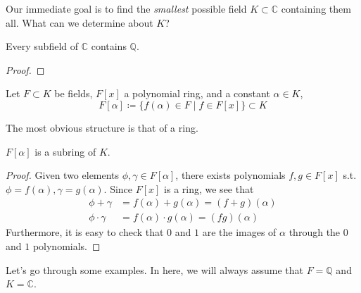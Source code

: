     Our immediate goal is to find the \textit{smallest} possible field $K \subset \mathbb{C}$ containing them all. What can we determine about $K$? 
    
    \begin{lemma}
      Every subfield of $\mathbb{C}$ contains $\mathbb{Q}$. 
    \end{lemma}
    \begin{proof}
      
    \end{proof} 

    \begin{definition} 
      Let $F \subset K$ be fields, $F[x]$ a polynomial ring, and a constant $\alpha \in K$, 
      \begin{equation}
        F[\alpha] \coloneqq \{ f(\alpha) \in F \mid f \in F[x]\} \subset K
      \end{equation}
    \end{definition} 

    The most obvious structure is that of a ring. 

    \begin{lemma}[Rings]
      $F[\alpha]$ is a subring of $K$. 
    \end{lemma}
    \begin{proof}
      Given two elements $\phi, \gamma \in F[\alpha]$, there exists polynomials $f, g \in F[x]$ s.t. $\phi = f(\alpha), \gamma = g(\alpha)$. Since $F[x]$ is a ring, we see that 
      \begin{align}
        \phi + \gamma & = f(\alpha) + g(\alpha) = (f + g)(\alpha) \\
        \phi \cdot \gamma & = f(\alpha) \cdot g(\alpha) = (fg)(\alpha)
      \end{align} 
      Furthermore, it is easy to check that $0$ and $1$ are the images of $\alpha$ through the $0$ and $1$ polynomials. 
    \end{proof} 

    Let's go through some examples. In here, we will always assume that $F = \mathbb{Q}$ and $K = \mathbb{C}$. 


